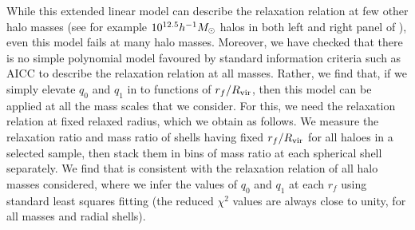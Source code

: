 While this extended linear model can describe the relaxation relation at few other halo masses (see for example $10^{12.5}h^{-1}M_{\odot}$ halos in both left and right panel of ), even this model fails at many halo masses.
Moreover, we have checked that there is no simple polynomial model favoured by standard information criteria such as AICC \citep[][]{2007MNRAS.377L..74L}
to describe the relaxation relation at all masses.
Rather,  we find that, if we 
simply elevate $q_0$ and $q_1$ in  to functions of $r_f/R_{\rm vir}$, then this model
can be applied at all the mass scales that we consider. For this, we need the relaxation relation at fixed relaxed radius, which we obtain as follows. We measure the relaxation ratio and mass ratio of shells having fixed $r_f/R_{\rm vir}$ for all haloes in a selected sample, then stack them in bins
of mass ratio at each spherical shell separately. 
We find that 
is consistent with the relaxation relation of all halo masses considered, where we infer the values of $q_0$ and $q_1$ at each $r_f$ using standard least squares fitting (the reduced $\chi^2$ values are always close to unity, for all masses and radial shells).

